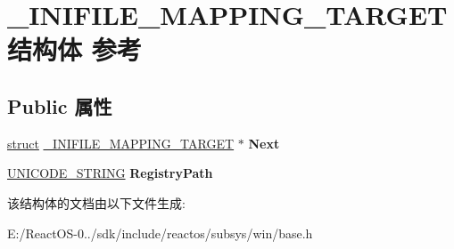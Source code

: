 \hypertarget{struct___i_n_i_f_i_l_e___m_a_p_p_i_n_g___t_a_r_g_e_t}{}\section{\+\_\+\+I\+N\+I\+F\+I\+L\+E\+\_\+\+M\+A\+P\+P\+I\+N\+G\+\_\+\+T\+A\+R\+G\+E\+T结构体 参考}
\label{struct___i_n_i_f_i_l_e___m_a_p_p_i_n_g___t_a_r_g_e_t}
\subsection*{Public 属性}
\begin{DoxyCompactItemize}
\item 
\mbox{\label{struct___i_n_i_f_i_l_e___m_a_p_p_i_n_g___t_a_r_g_e_t_a81ccec5c5d4aefb1ceea27ac7b805095}} 
\hyperlink{interfacestruct}{struct} \hyperlink{struct___i_n_i_f_i_l_e___m_a_p_p_i_n_g___t_a_r_g_e_t}{\+\_\+\+I\+N\+I\+F\+I\+L\+E\+\_\+\+M\+A\+P\+P\+I\+N\+G\+\_\+\+T\+A\+R\+G\+ET} $\ast$ {\bfseries Next}
\item 
\mbox{\label{struct___i_n_i_f_i_l_e___m_a_p_p_i_n_g___t_a_r_g_e_t_afe6168274ebe8d4ad1d54b9ed26106a6}} 
\hyperlink{struct___u_n_i_c_o_d_e___s_t_r_i_n_g}{U\+N\+I\+C\+O\+D\+E\+\_\+\+S\+T\+R\+I\+NG} {\bfseries Registry\+Path}
\end{DoxyCompactItemize}


该结构体的文档由以下文件生成\+:\begin{DoxyCompactItemize}
\item 
E\+:/\+React\+O\+S-\/0../sdk/include/reactos/subsys/win/base.\+h\end{DoxyCompactItemize}
